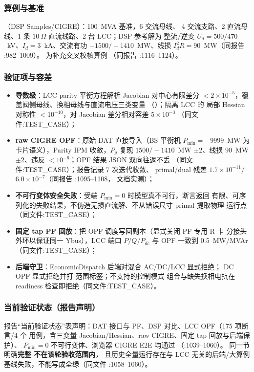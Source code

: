 \subsubsection*{算例与基准}
（DSP Samples/CIGRE）：100~MVA 基准，6 交流母线、
4 交流支路、2 直流母线、1 条 $10~\Omega$ 直流线路、2 台 LCC；DSP 参考解为
整流/逆变 $U_d=500/470$~kV、$I_d=3$~kA、交流有功 $-1500/+1410$~MW、线损
$I_d^2R=90$~MW（同报告 :982--1009）。 为补充交叉校核算例
（同报告 :1116--1124）。

\subsubsection*{验证项与容差}
\begin{itemize}
  \item \textbf{导数级}：LCC parity 平衡方程解析 Jacobian 对中心有限差分
        $<2\times10^{-5}$，覆盖阀侧母线、换相母线与直流电压三类变量
        （）；隔离 LCC 的
        局部 Hessian 对称性 $<10^{-10}$，对 Jacobian 差分相对容差 $5\times10^{-3}$
        （同文件:TEST\_CASE）；
  \item \textbf{raw CIGRE OPF}：原始 DAT 直接导入（BS 平衡机 $P_{\min}=-9999$~MW
        为卡片语义），Parity IPM 收敛，$P_g$ 复现 $1500/-1410$~MW $\pm2$、线损
        90~MW $\pm2$、违反 $<10^{-6}$；OPF 结果 JSON 双向往返不丢
        （同文件:TEST\_CASE）；报告记录 7 次迭代收敛、
        primal/dual 残差 $1.7\times10^{-11}$/$6.0\times10^{-7}$（同报告 :1095--1108，
        文档实测）；
  \item \textbf{不可行变体安全失败}：受端 $P_{\min}=0$ 时模型真不可行，断言返回
        有限、可序列化的失败结果，不伪造无损直流解、不从错误尺寸 primal 提取物理
        运行点（同文件:TEST\_CASE）；
  \item \textbf{固定 tap PF 回放}：把 OPF 调度写回副本（显式关闭 PF 专用 R 卡
        分接头外环以保证同一 Ybus），LCC 端口 $P/Q/P_{dc}$ 与 OPF 一致到
        0.5~MW/MVAr（同文件:TEST\_CASE）；
  \item \textbf{后端守卫}：EconomicDispatch 后端对混合 AC/DC/LCC 显式拒绝；
        DC OPF 显式拒绝并打  范围标签；不支持的控制模式
        组合与缺失换相电抗在 readiness 检查即拒绝（同文件:TEST\_CASE）。
\end{itemize}

\subsubsection*{当前验证状态（报告声明）}
报告“当前验证状态”表声明：DAT 接口与 PF、DSP 对比、LCC OPF（175 项断言/4 个
用例，含三变量 Jacobian/Hessian、raw CIGRE、固定 tap 回放与后端保护）、
$P_{\min}=0$ 不可行变体、浏览器 CIGRE E2E 均通过
（:1039--1060）。
同一节明确\textbf{完整  不在该轮验收范围内}，
且历史全量运行存在与 LCC 无关的后端/大算例基线失败，不能写成全绿（同文件
:1058--1060）。

